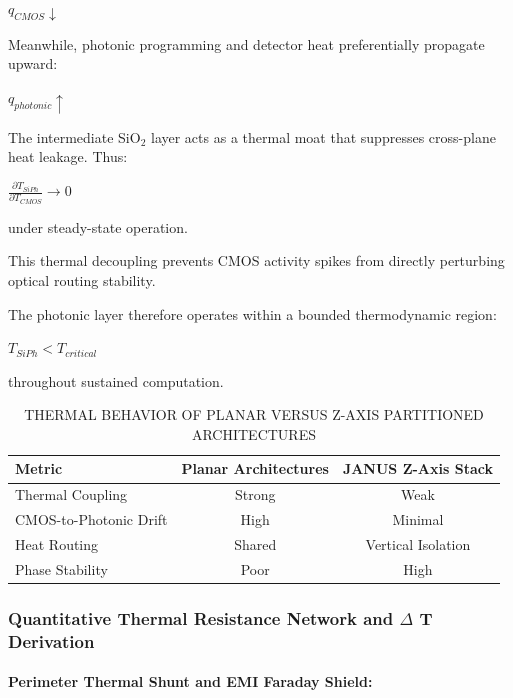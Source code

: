 \documentclass[journal]{IEEEtran}
\begin{document}
\begin{center}
\textbf{$q_{CMOS} \downarrow$}
\end{center}

Meanwhile, photonic programming and detector heat preferentially propagate upward:
\begin{center}
\textbf{$q_{photonic} \uparrow$}
\end{center}

The intermediate SiO$_2$ layer acts as a thermal moat that suppresses cross-plane heat leakage. Thus:

\begin{center}
\textbf{$\frac {\partial T_{SiPh}}{ \partial T_{CMOS}} \rightarrow 0$}
\end{center}

under steady-state operation.

This thermal decoupling prevents CMOS activity spikes from directly perturbing optical routing stability.

The photonic layer therefore operates within a bounded thermodynamic region:

\begin{center}
\textbf{$T_{SiPh} < T_{critical}$}
\end{center}

throughout sustained computation.

\begin{table}[htbp]
\centering
\small
\setlength{\tabcolsep}{1pt}
\caption{THERMAL BEHAVIOR OF PLANAR VERSUS Z-AXIS PARTITIONED ARCHITECTURES}
\label{tab:table10}
\begin{tabular}{lcc}
\toprule
Metric & Planar Architectures & JANUS Z-Axis Stack \\
\midrule
Thermal Coupling & Strong & Weak \\
CMOS-to-Photonic Drift & High & Minimal \\
Heat Routing & Shared & Vertical Isolation \\
Phase Stability & Poor & High \\
\bottomrule
\end{tabular}
\end{table}

\subsubsection{\textbf{Quantitative Thermal Resistance Network and $\Delta$ T Derivation}}

\paragraph{\textbf{Perimeter Thermal Shunt and EMI Faraday Shield:}}
\end{document}
